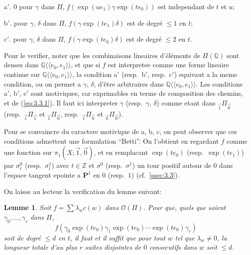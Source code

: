 \documentclass[11pt,a4paper]{article}
\theoremstyle{plain}
\newtheorem{lemma}[theorem]{Lemme}
\theoremstyle{definition}
\newcommand{\Z}{\mathbb{Z}}
\newcommand{\Q}{\mathbb{Q}}
\begin{document}
a$'$. $0$ pour $\gamma$ dans $\Pi$, $f(\exp(u e_1) \gamma \exp(t e_0))$ est independant de $t$ et $u$;

b$'$. pour $\gamma$, $\delta$ dans $\Pi$, $f(\gamma \exp(t e_1) \delta)$ est de degr\'e $\leq 1$ en $t$;

c$'$. pour $\gamma$, $\delta$ dans $\Pi$, $f(\gamma \exp(t e_0) \delta)$ est de degr\'e $\leq 2$ en $t$.

Pour le verifier, noter que les combinaisons lineaires d'\'el\'ements de $\Pi(\Q)$ sont denses dans $\Q\langle\langle e_0,e_1 \rangle\rangle$, et que si $f$ est interpretee comme une forme lineaire continue sur $\Q\langle\langle e_0,e_1 \rangle\rangle$, la condition a$'$ (resp.~b$'$, resp.~c$'$) equivaut a la meme condition, ou on permet a $\gamma$, $\delta$, d'\^etre arbitraires dans $\Q\langle\langle e_0,e_1 \rangle\rangle$. Les conditions a$'$, b$'$, c$'$ sont motiviques, car exprimables en terme de composition des chemins, et de (\ref{eq:3.3.1}). Il faut ici interpreter $\gamma$ (resp.~$\gamma$, $\delta$) comme etant dans ${}_{\vec{1}}\Pi_{\vec{0}}$ (resp.~${}_{\vec{1}}\Pi_{\vec{1}}$ et ${}_{\vec{1}}\Pi_{\vec{0}}$, resp.~${}_{\vec{1}}\Pi_{\vec{0}}$ et ${}_{\vec{0}}\Pi_{\vec{0}}$).

Pour se convaincre du caractere motivique de a, b, c, on peut observer que ces conditions admettent une formulation ``Betti''. On l'obtient en regardant $f$ comme une fonction sur $\pi_1(X;\vec{1},\vec{0})$, et en remplacant $\exp(t e_0)$ (resp.~$\exp(t e_1)$) par $\sigma_t^0$ (resp.~$\sigma_t^1$) avec $t \in \Z$ et $\sigma^0$ (resp.~$\sigma^1$) un tour positif autour de $0$ dans l'espace tangent epointe a $\mathbf{P}^1$ en $0$ (resp.~$1$) (cf.~\ref{ssec:3.3}).

On laisse au lecteur la verification du lemme suivant:

\begin{lemma}\label{lem:6.4}
Soit $f = \sum \lambda_w c(w)$ dans $\mathcal{O}(\Pi)$. Pour que, quels que soient $\gamma_0,\ldots,\gamma_r$ dans $\Pi$,
\begin{equation}\label{eq:6.4.1}
f(\gamma_0 \exp(t e_0) \gamma_1 \exp(t e_0) \cdots \exp(t e_0) \gamma_r)
\end{equation}
soit de degr\'e $\leq d$ en $t$, il faut et il suffit que pour tout $w$ tel que $\lambda_w \neq 0$, la longueur totale d'au plus $r$ suites disjointes de $0$ consecutifs dans $w$ soit $\leq d$.
\end{lemma}

\subsection{}\label{ssec:6.5}
\end{document}
